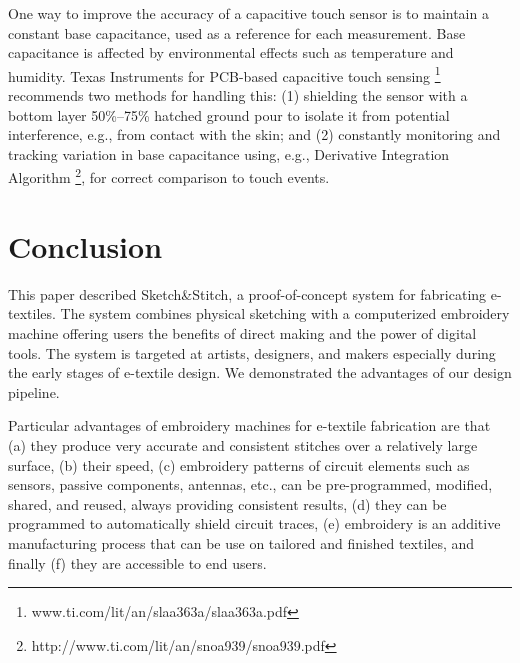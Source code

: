\documentclass[header.tex]{subfiles}
\begin{document}
One way to improve the accuracy of a capacitive touch sensor is to maintain a constant base capacitance, used as a reference for each measurement. Base capacitance is affected by environmental effects such as temperature and humidity. Texas Instruments for PCB-based capacitive touch sensing \footnote{www.ti.com/lit/an/slaa363a/slaa363a.pdf} recommends two methods for handling this: (1) shielding the sensor with a bottom layer 50\%--75\% hatched ground pour to isolate it from potential
interference, e.g., from contact with the skin; and (2) constantly monitoring and tracking variation in base capacitance using, e.g., Derivative Integration Algorithm \footnote{http://www.ti.com/lit/an/snoa939/snoa939.pdf}, for correct comparison to
touch events.










\section{Conclusion}
This paper described Sketch\&Stitch, a proof-of-concept system for fabricating e-textiles. The system combines physical sketching with a computerized embroidery machine offering users the benefits of direct making and the power of digital tools. The system is targeted at artists, designers, and makers especially during the early stages of e-textile design. We demonstrated the advantages of our design pipeline.


Particular advantages of embroidery machines for e-textile fabrication are that (a) they produce very accurate and consistent stitches over a relatively large surface, (b) their speed, (c) embroidery patterns of circuit elements such as sensors, passive components, antennas, etc., can be pre-programmed, modified, shared, and reused, always providing consistent results, (d) they can be programmed to automatically shield circuit traces, (e) embroidery is an additive manufacturing process that can be use on tailored and finished textiles, 
and finally (f) they are accessible to end users.


\balance{}



\end{document}
